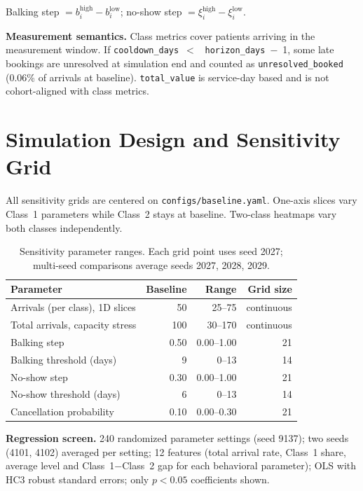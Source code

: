 \documentclass[11pt]{article}
\begin{document}
Balking step $= b_i^{\text{high}} - b_i^{\text{low}}$; no-show step
$= \xi_i^{\text{high}} - \xi_i^{\text{low}}$.

\medskip
\noindent\textbf{Measurement semantics.} Class metrics cover patients
arriving in the measurement window. If \texttt{cooldown\_days}~$<$~%
\texttt{horizon\_days}~$-$~1, some late bookings are unresolved at
simulation end and counted as \texttt{unresolved\_booked} (0.06\% of
arrivals at baseline). \texttt{total\_value} is service-day based and
is not cohort-aligned with class metrics.

\section{Simulation Design and Sensitivity Grid}
\label{app:sens-design}

All sensitivity grids are centered on \texttt{configs/baseline.yaml}.
One-axis slices vary Class~1 parameters while Class~2 stays at baseline.
Two-class heatmaps vary both classes independently.

\begin{table}[H]
\centering
\renewcommand{\arraystretch}{1.15}
\begin{tabular}{p{}rrr}
\toprule
Parameter & Baseline & Range & Grid size \\
\midrule
Arrivals (per class), 1D slices & 50 & 25--75 & continuous \\
Total arrivals, capacity stress & 100 & 30--170 & continuous \\
Balking step & 0.50 & 0.00--1.00 & 21 \\
Balking threshold (days) & 9 & 0--13 & 14 \\
No-show step & 0.30 & 0.00--1.00 & 21 \\
No-show threshold (days) & 6 & 0--13 & 14 \\
Cancellation probability & 0.10 & 0.00--0.30 & 21 \\
\bottomrule
\end{tabular}
\caption{Sensitivity parameter ranges. Each grid point uses seed 2027;
multi-seed comparisons average seeds 2027, 2028, 2029.}
\label{tab:sens-grid}
\end{table}

\textbf{Regression screen.}
240 randomized parameter settings (seed 9137); two seeds (4101, 4102)
averaged per setting; 12 features (total arrival rate, Class~1 share,
average level and Class~1$-$Class~2 gap for each behavioral parameter);
OLS with HC3 robust standard errors; only $p < 0.05$ coefficients shown.
\end{document}
